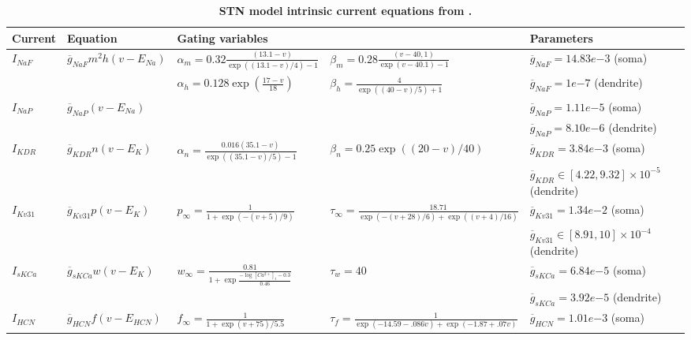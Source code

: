 \begin{table}[ht]
\centering
\caption{
{\bf STN model intrinsic current equations from \cite{gillies_membrane_2005}.}}
\begin{adjustbox}{width=\textwidth} %
\begin{tabular}{lllll}
\toprule
Current & Equation & Gating variables &  & Parameters \\ \midrule
$ I_{NaF} $ & $ \overline{g}_{NaF} m^2 h (v - E_{Na}) $ & $ \alpha _ { m } = 0.32 \frac { \left( 13.1 − v \right) } { \exp ( ( 13.1 − v ) / 4 ) − 1 } $ & $ \beta _ { m } = 0.28 \frac { \left( v - 40,1 \right) } { \exp \left( v - 40.1 \right) − 1 } $ & $ \overline{g}_{NaF} = 14.83 e{-3} $ (soma) \\
 &  &$ \alpha _ { h } = 0.128 \exp \left( \frac{ 17 − v } { 18 } \right) $ & $ \beta _ { h } = \frac { 4 } { \exp \left( \left( 40 − v \right) / 5 \right) + 1 } $ & $ \overline{g}_{NaF} = 1 e{-7} $ (dendrite) \\ \midrule
$ I_{NaP} $ & $ \overline{g}_{NaP} (v - E_{Na}) $ &  &  & $ \overline{g}_{NaP} = 1.11 e{-5} $ (soma) \\
 &  &  &  & $ \overline{g}_{NaP} = 8.10 e{-6} $ (dendrite) \\ \midrule
$ I_{KDR} $ & $ \overline{g}_{KDR} n (v - E_{K}) $ & $ \alpha _ { n } = \frac { 0.016 \left( 35.1 − v \right) } { \exp \left( \left( 35.1 − v \right) / 5 \right) − 1 } $ & $ \beta _ { n } = 0.25 \exp \left( \left( 20 − v \right) / 40 \right) $ & $ \overline{g}_{KDR} = 3.84 e{-3} $ (soma) \\
 &  &  &  & $ \overline{g}_{KDR} \in \left[ 4.22 , 9.32 \right] \times 10^{−5} $ (dendrite) \\ \midrule
$ I_{Kv31} $ & $ \overline{g}_{Kv31} p (v - E_{K}) $ & $ p _ { \infty } = \frac { 1 } { 1 + \exp \left( − \left( v + 5 \right) / 9 \right) } $ & $ \tau_{\infty} = \frac{ 18.71 }{ \exp ( − (v + 28) / 6 ) + \exp ( ( v + 4) / 16 ) } $ & $ \overline{g}_{Kv31} = 1.34 e{-2} $ (soma) \\
 &  &  &  & $ \overline{g}_{Kv31} \in \left[ 8.91 , 10 \right] \times 10^{−4} $ (dendrite) \\ \midrule
$ I_{sKCa} $ & $ \overline{g}_{sKCa} w (v - E_{K}) $ & $ w_{ \infty } = \frac{ 0.81 }{ 1 + \exp \frac{ − \log \left[ Ca^{2+} \right]_i - 0.3 } { 0.46 } } $ & $ \tau_{w} = 40 $ & $ \overline{g}_{sKCa} = 6.84 e{-5} $ (soma) \\
 &  &  &  & $ \overline{g}_{sKCa} = 3.92 e{-5} $ (dendrite) \\ \midrule
$ I_{HCN} $ & $ \overline{g}_{HCN} f (v - E_{HCN}) $ & $ f_{\infty} = \frac { 1 } { 1 + \exp \left( v + 75 \right) / 5.5 } $ & $ \tau_{f} = \frac { 1 } { \exp \left( − 14.59 − .086 v \right) + \exp \left( − 1.87 + .07 v \right) } $ & $ \overline{g}_{HCN} = 1.01 e{-3} $ (soma) \\

\end{tabular}
\end{adjustbox}
\end{table}
